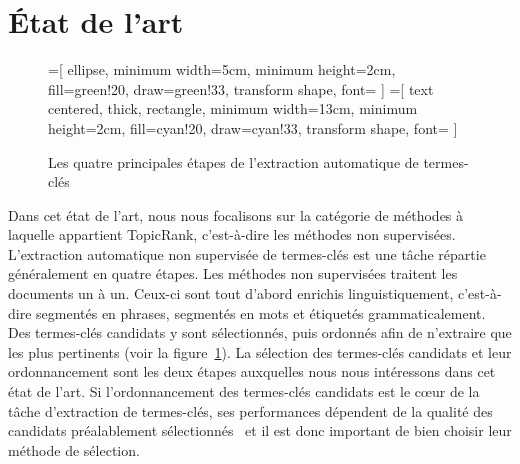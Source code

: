 \section{État de l'art}
\label{sec:etat_de_l_art}
  \begin{figure}
    =[
      ellipse,
      minimum width=5cm,
      minimum height=2cm,
      fill=green!20,
      draw=green!33,
      transform shape,
      font={\huge}
    ]
    =[
      text centered,
      thick,
      rectangle,
      minimum width=13cm,
      minimum height=2cm,
      fill=cyan!20,
      draw=cyan!33,
      transform shape,
      font={\huge\bfseries}
    ]

    \centering
    \caption{Les quatre principales étapes de l'extraction automatique de
             termes-clés \label{fig:etapes_de_l_extraction_de_termes_cles}}
  \end{figure}
  Dans cet état de l'art, nous nous focalisons sur la catégorie de méthodes à
  laquelle appartient TopicRank, c'est-à-dire les méthodes non supervisées.
  L'extraction automatique non supervisée de termes-clés est une tâche répartie
  généralement en quatre étapes. Les méthodes non supervisées traitent les
  documents un à un. Ceux-ci sont tout d'abord enrichis linguistiquement,
  c'est-à-dire segmentés en phrases, segmentés en mots  et étiquetés
  grammaticalement. Des termes-clés candidats y sont sélectionnés, puis
  ordonnés afin de n'extraire que les plus pertinents (voir la
  figure~\ref{fig:etapes_de_l_extraction_de_termes_cles}). La sélection des
  termes-clés candidats et leur ordonnancement sont les deux étapes auxquelles
  nous nous intéressons dans cet état de l'art. Si l'ordonnancement des
  termes-clés candidats est le c\oe{}ur de la tâche d'extraction de termes-clés,
  ses performances dépendent de la qualité des candidats préalablement
  sélectionnés~\cite{wang2014keyphraseextractionpreprocessing} et il est donc
  important de bien choisir leur méthode de sélection.

